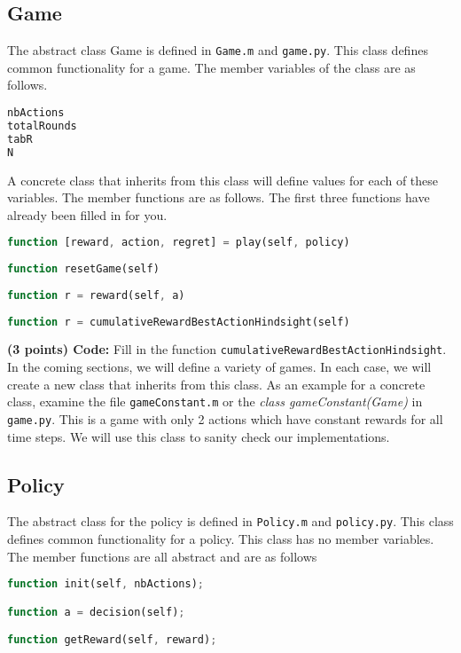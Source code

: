 \documentclass{article}
\begin{document}
\subsection{Game}
The abstract class Game is defined in \texttt{Game.m} and \texttt{game.py}. This class defines common functionality for a game.  
The member variables of the class are as follows.
\begin{lstlisting}[language=Octave]
nbActions   
totalRounds 
tabR        
N           

\end{lstlisting}
A concrete class that inherits from this class will define values for each of these variables. 
The member functions are as follows. The first three functions have already been filled in for you.
\begin{lstlisting}[language=Octave]
function [reward, action, regret] = play(self, policy)
   
function resetGame(self)
   
function r = reward(self, a)
   
function r = cumulativeRewardBestActionHindsight(self)

\end{lstlisting}

\noindent\textbf{(3 points) Code:} Fill in the function \texttt{cumulativeRewardBestActionHindsight}.\\


\noindent In the coming sections, we will define a variety of games. In each case, we will create a new class that inherits from this class. As an example for a concrete class, examine the file \texttt{gameConstant.m} or the \textit{class gameConstant(Game)} in \texttt{game.py}. This is a game with only 2 actions which have constant rewards for all time steps. We will use this class to sanity check our implementations.

\subsection{Policy}
The abstract class for the policy is defined in \texttt{Policy.m} and \texttt{policy.py}. This class defines common functionality for a policy. This class has no member variables. The member functions are all abstract and are as follows  

\begin{lstlisting}[language=Octave]
function init(self, nbActions); 

function a = decision(self); 

function getReward(self, reward); 

\end{lstlisting}
\end{document}

